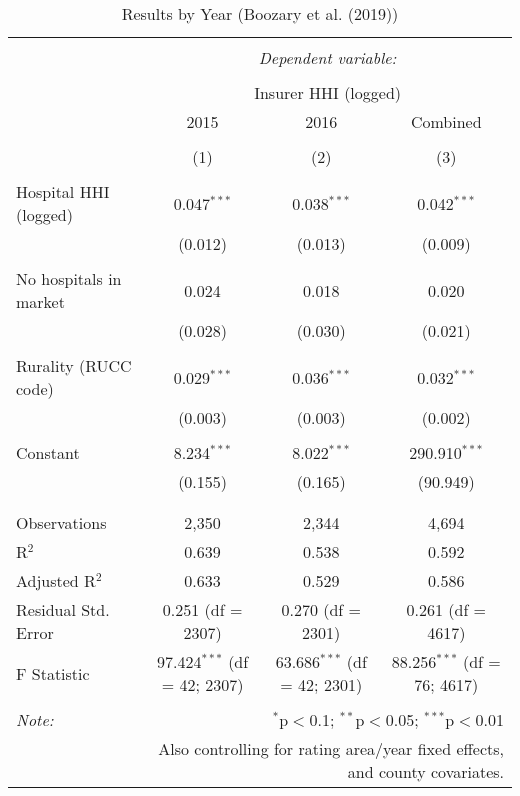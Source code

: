 
\begin{table}[!htbp] \centering 
  \caption{Results by Year (Boozary et al. (2019))} 
  \label{} 
\scriptsize 
\begin{tabular}{@{\extracolsep{5pt}}lccc} 
\\[-1.8ex]\hline 
\hline \\[-1.8ex] 
 & \multicolumn{3}{c}{\textit{Dependent variable:}} \\ 
\cline{2-4} 
\\[-1.8ex] & \multicolumn{3}{c}{Insurer HHI (logged)} \\ 
 & 2015 & 2016 & Combined \\ 
\\[-1.8ex] & (1) & (2) & (3)\\ 
\hline \\[-1.8ex] 
 Hospital HHI (logged) & 0.047$^{***}$ & 0.038$^{***}$ & 0.042$^{***}$ \\ 
  & (0.012) & (0.013) & (0.009) \\ 
  & & & \\ 
 No hospitals in market & 0.024 & 0.018 & 0.020 \\ 
  & (0.028) & (0.030) & (0.021) \\ 
  & & & \\ 
 Rurality (RUCC code) & 0.029$^{***}$ & 0.036$^{***}$ & 0.032$^{***}$ \\ 
  & (0.003) & (0.003) & (0.002) \\ 
  & & & \\ 
 Constant & 8.234$^{***}$ & 8.022$^{***}$ & 290.910$^{***}$ \\ 
  & (0.155) & (0.165) & (90.949) \\ 
  & & & \\ 
\hline \\[-1.8ex] 
Observations & 2,350 & 2,344 & 4,694 \\ 
R$^{2}$ & 0.639 & 0.538 & 0.592 \\ 
Adjusted R$^{2}$ & 0.633 & 0.529 & 0.586 \\ 
Residual Std. Error & 0.251 (df = 2307) & 0.270 (df = 2301) & 0.261 (df = 4617) \\ 
F Statistic & 97.424$^{***}$ (df = 42; 2307) & 63.686$^{***}$ (df = 42; 2301) & 88.256$^{***}$ (df = 76; 4617) \\ 
\hline 
\hline \\[-1.8ex] 
\textit{Note:}  & \multicolumn{3}{r}{$^{*}$p$<$0.1; $^{**}$p$<$0.05; $^{***}$p$<$0.01} \\ 
 & \multicolumn{3}{r}{Also controlling for rating area/year fixed effects, and county covariates.} \\ 
\end{tabular} 
\end{table} 
